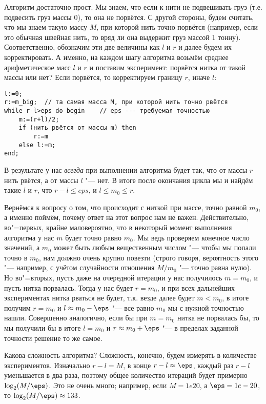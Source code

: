 Алгоритм достаточно прост. Мы знаем, что если к нити не подвешивать груз (т.е. подвесить груз массы $0$), то она не порвётся. 
С другой стороны, будем считать, что мы знаем такую массу $M$, при которой нить точно порвётся 
(например, если это обычная швейная нить, то вряд ли она выдержит груз массой 1 тонну).
Соответственно, обозначим эти две величины как $l$ и $r$ и далее будем их корректировать. 
А именно, на каждом шагу алгоритма возьмём среднее арифметическое масс $l$ и $r$ и поставим эксперимент: порвётся нитка от такой массы или нет? 
Если порвётся, то корректируем границу $r$, иначе $l$:
\begin{codesampleo}\begin{verbatim}
l:=0;
r:=m_big;  // та самая масса M, при которой нить точно рвётся
while r-l>eps do begin    // eps --- требуемая точностью
    m:=(r+l)/2;
    if (нить рвётся от массы m) then
        r:=m
    else l:=m;
end;
\end{verbatim}
\end{codesampleo}

В результате у нас \textit{всегда} при выполнении алгоритма будет так, что от массы $r$ нить рвётся, а от массы $l$ "--- нет. 
В итоге после окончания цикла мы и найдём такие $l$ и $r$, что $r-l\leq eps$, и $l\leq m_0\leq r$.

Вернёмся к вопросу о том, что происходит с ниткой при массе, точно равной $m_0$, а именно поймём, почему ответ на этот вопрос нам не важен.
Действительно, во"=первых, крайне маловероятно, что в некоторый момент выполнения алгоритма у нас $m$ будет точно равно $m_0$.
Мы ведь проверяем конечное число значений, а $m_0$ может быть любым вещественным числом "--- чтобы мы попали точно в $m_0$,
нам должно очень крупно повезти (строго говоря, вероятность этого "--- например, с учётом случайности отношения $M/m_0$ "--- точно равна нулю).
Но во"=вторых, пусть даже на очередной итерации у нас получилось $m=m_0$, и пусть нитка порвалась. 
Тогда у нас будет $r=m_0$, и при всех дальнейших экспериментах нитка рваться не будет, т.к. везде далее будет $m<m_0$,
в итоге получим $r=m_0$ и $l\approx m_0-\eps$ "--- все равно $m_0$ мы с нужной точностью нашли. 
Совершенно аналогично, если бы при $m=m_0$ нитка не порвалась бы, то мы получили бы в итоге $l=m_0$ и $r\approx m_0+\eps$ 
"--- в пределах заданной точности решение то же самое.

Какова сложность алгоритма? Сложность, конечно, будем измерять в количестве экспериментов.
Изначально $r-l=M$, в конце $r-l\approx \eps$, каждый раз $r-l$ уменьшается в два раза,
поэтому общее количество итераций будет примерно $\log_2 (M/\eps)$. 
Это не очень много; например, если $M=1e20$, а $\eps=1e-20$, то $\log_2 (M/\eps)\approx 133$.

